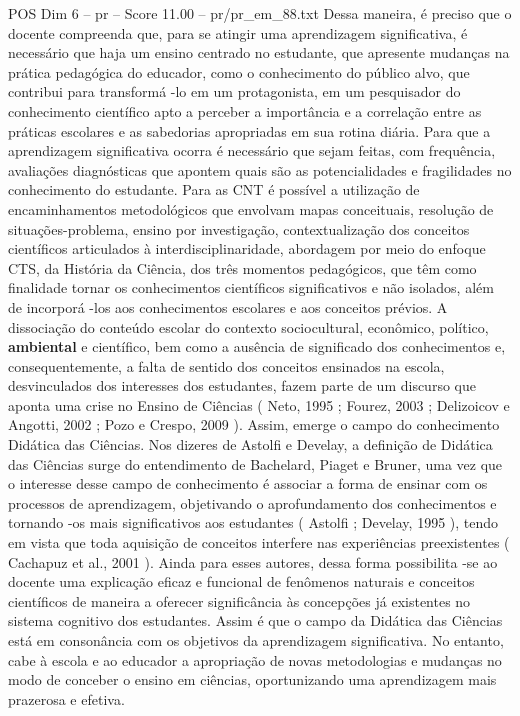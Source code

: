 \begin{textsample}{POS Dim 6 – pr – Score 11.00 – pr/pr\_em\_88.txt}
Dessa maneira, é preciso que o docente compreenda que, para se atingir uma aprendizagem significativa, é necessário que haja um ensino centrado no estudante, que apresente mudanças na prática pedagógica do educador, como o conhecimento do público alvo, que contribui para transformá -lo em um protagonista, em um pesquisador do conhecimento científico apto a perceber a importância e a correlação entre as práticas escolares e as sabedorias apropriadas em sua rotina diária.
Para que a aprendizagem significativa ocorra é necessário que sejam feitas, com frequência, avaliações diagnósticas que apontem quais são as potencialidades e fragilidades no conhecimento do estudante.
Para as CNT é possível a utilização de encaminhamentos metodológicos que envolvam mapas conceituais, resolução de situações-problema, ensino por investigação, contextualização dos conceitos científicos articulados à interdisciplinaridade, abordagem por meio do enfoque CTS, da História da Ciência, dos três momentos pedagógicos, que têm como finalidade tornar os conhecimentos científicos significativos e não isolados, além de incorporá -los aos conhecimentos escolares e aos conceitos prévios.
A dissociação do conteúdo escolar do contexto sociocultural, econômico, político, \textbf{ambiental} e científico, bem como a ausência de significado dos conhecimentos e, consequentemente, a falta de sentido dos conceitos ensinados na escola, desvinculados dos interesses dos estudantes, fazem parte de um discurso que aponta uma crise no Ensino de Ciências ( Neto, 1995 ; Fourez, 2003 ; Delizoicov e Angotti, 2002 ; Pozo e Crespo, 2009 ).
Assim, emerge o campo do conhecimento Didática das Ciências.
Nos dizeres de Astolfi e Develay, a definição de Didática das Ciências surge do entendimento de Bachelard, Piaget e Bruner, uma vez que o interesse desse campo de conhecimento é associar a forma de ensinar com os processos de aprendizagem, objetivando o aprofundamento dos conhecimentos e tornando -os mais significativos aos estudantes ( Astolfi ; Develay, 1995 ), tendo em vista que toda aquisição de conceitos interfere nas experiências preexistentes ( Cachapuz et al., 2001 ).
Ainda para esses autores, dessa forma possibilita -se ao docente uma explicação eficaz e funcional de fenômenos naturais e conceitos científicos de maneira a oferecer significância às concepções já existentes no sistema cognitivo dos estudantes.
Assim é que o campo da Didática das Ciências está em consonância com os objetivos da aprendizagem significativa.
No entanto, cabe à escola e ao educador a apropriação de novas metodologias e mudanças no modo de conceber o ensino em ciências, oportunizando uma aprendizagem mais prazerosa e efetiva.

\end{textsample}
